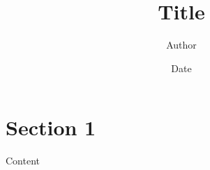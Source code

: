 \documentclass{jarticle}
\title{Title}
\author{Author}
\date{Date}
\begin{document}
\maketitle

\section{Section 1} %
Content
\end{document}
